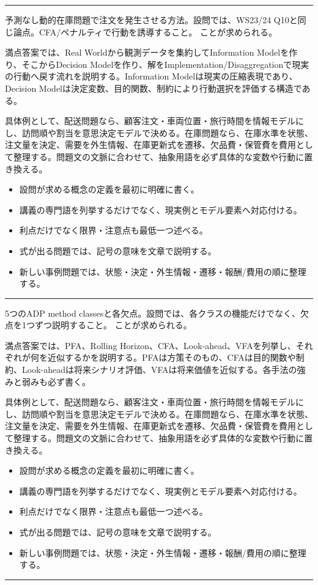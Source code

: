 \vspace{2mm}\hrule\vspace{2mm}
予測なし動的在庫問題で注文を発生させる方法。設問では、WS23/24 Q10と同じ論点。CFA/ペナルティで行動を誘導すること。 ことが求められる。\par
{}
満点答案では、Real Worldから観測データを集約してInformation Modelを作り、そこからDecision Modelを作り、解をImplementation/Disaggregationで現実の行動へ戻す流れを説明する。Information Modelは現実の圧縮表現であり、Decision Modelは決定変数、目的関数、制約により行動選択を評価する構造である。\par
{}
具体例として、配送問題なら、顧客注文・車両位置・旅行時間を情報モデルにし、訪問順や割当を意思決定モデルで決める。在庫問題なら、在庫水準を状態、注文量を決定、需要を外生情報、在庫更新式を遷移、欠品費・保管費を費用として整理する。問題文の文脈に合わせて、抽象用語を必ず具体的な変数や行動に置き換える。\par
{}
\begin{itemize}
\item 設問が求める概念の定義を最初に明確に書く。
\item 講義の専門語を列挙するだけでなく、現実例とモデル要素へ対応付ける。
\item 利点だけでなく限界・注意点も最低一つ述べる。
\item 式が出る問題では、記号の意味を文章で説明する。
\item 新しい事例問題では、状態・決定・外生情報・遷移・報酬/費用の順に整理する。
\end{itemize}
\vspace{2mm}\hrule\vspace{2mm}
5つのADP method classesと各欠点。設問では、各クラスの機能だけでなく、欠点を1つずつ説明すること。 ことが求められる。\par
{}
満点答案では、PFA、Rolling Horizon、CFA、Look-ahead、VFAを列挙し、それぞれが何を近似するかを説明する。PFAは方策そのもの、CFAは目的関数や制約、Look-aheadは将来シナリオ評価、VFAは将来価値を近似する。各手法の強みと弱みも必ず書く。\par
{}
具体例として、配送問題なら、顧客注文・車両位置・旅行時間を情報モデルにし、訪問順や割当を意思決定モデルで決める。在庫問題なら、在庫水準を状態、注文量を決定、需要を外生情報、在庫更新式を遷移、欠品費・保管費を費用として整理する。問題文の文脈に合わせて、抽象用語を必ず具体的な変数や行動に置き換える。\par
{}
\begin{itemize}
\item 設問が求める概念の定義を最初に明確に書く。
\item 講義の専門語を列挙するだけでなく、現実例とモデル要素へ対応付ける。
\item 利点だけでなく限界・注意点も最低一つ述べる。
\item 式が出る問題では、記号の意味を文章で説明する。
\item 新しい事例問題では、状態・決定・外生情報・遷移・報酬/費用の順に整理する。
\end{itemize}
\vspace{2mm}\hrule\vspace{2mm}